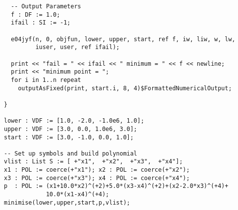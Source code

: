 \begin{enumerate}
\begin{small}
\begin{verbatim}
  -- Output Parameters
  f : DF := 1.0; 
  ifail : SI := -1;

  e04jyf(n, 0, objfun, lower, upper, start, ref f, iw, liw, w, lw, 
         iuser, user, ref ifail);

  print << "fail = " << ifail << " minimum = " << f << newline; 
  print << "minimum point = ";
  for i in 1..n repeat 
    outputAsFixed(print, start.i, 8, 4)$FormattedNumericalOutput;

}

lower : VDF := [1.0, -2.0, -1.0e6, 1.0];
upper : VDF := [3.0, 0.0, 1.0e6, 3.0];
start : VDF := [3.0, -1.0, 0.0, 1.0];

-- Set up symbols and build polynomial
vlist : List S := [ +"x1",  +"x2",  +"x3",  +"x4"];
x1 : POL := coerce(+"x1"); x2 : POL := coerce(+"x2");
x3 : POL := coerce(+"x3"); x4 : POL := coerce(+"x4");
p  : POL := (x1+10.0*x2)^(+2)+5.0*(x3-x4)^(+2)+(x2-2.0*x3)^(+4)+
            10.0*(x1-x4)^(+4); 
minimise(lower,upper,start,p,vlist);
\end{verbatim}
\end{small}

  
\end{enumerate}
